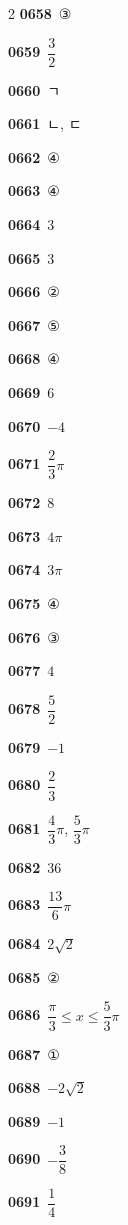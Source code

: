 \documentclass[10pt,a4paper]{article}
\begin{document}
\begin{multicols}{2}
\noindent\textbf{0658}\ ③\par
\noindent\textbf{0659}\ $\dfrac{3}{2}$\par
\noindent\textbf{0660}\ ㄱ\par
\noindent\textbf{0661}\ ㄴ, ㄷ\par
\noindent\textbf{0662}\ ④\par
\noindent\textbf{0663}\ ④\par
\noindent\textbf{0664}\ $3$\par
\noindent\textbf{0665}\ $3$\par
\noindent\textbf{0666}\ ②\par
\noindent\textbf{0667}\ ⑤\par
\noindent\textbf{0668}\ ④\par
\noindent\textbf{0669}\ $6$\par
\noindent\textbf{0670}\ $-4$\par
\noindent\textbf{0671}\ $\dfrac{2}{3}\pi$\par
\noindent\textbf{0672}\ $8$\par
\noindent\textbf{0673}\ $4\pi$\par
\noindent\textbf{0674}\ $3\pi$\par
\noindent\textbf{0675}\ ④\par
\noindent\textbf{0676}\ ③\par
\noindent\textbf{0677}\ $4$\par
\noindent\textbf{0678}\ $\dfrac{5}{2}$\par
\noindent\textbf{0679}\ $-1$\par
\noindent\textbf{0680}\ $\dfrac{2}{3}$\par
\noindent\textbf{0681}\ $\dfrac{4}{3}\pi$, $\dfrac{5}{3}\pi$\par
\noindent\textbf{0682}\ $36$\par
\noindent\textbf{0683}\ $\dfrac{13}{6}\pi$\par
\noindent\textbf{0684}\ $2\sqrt{2}$\par
\noindent\textbf{0685}\ ②\par
\noindent\textbf{0686}\ $\dfrac{\pi}{3}\le x\le\dfrac{5}{3}\pi$\par
\noindent\textbf{0687}\ ①\par
\noindent\textbf{0688}\ $-2\sqrt{2}$\par
\noindent\textbf{0689}\ $-1$\par
\noindent\textbf{0690}\ $-\dfrac{3}{8}$\par
\noindent\textbf{0691}\ $\dfrac{1}{4}$\par

\end{multicols}
\end{document}
